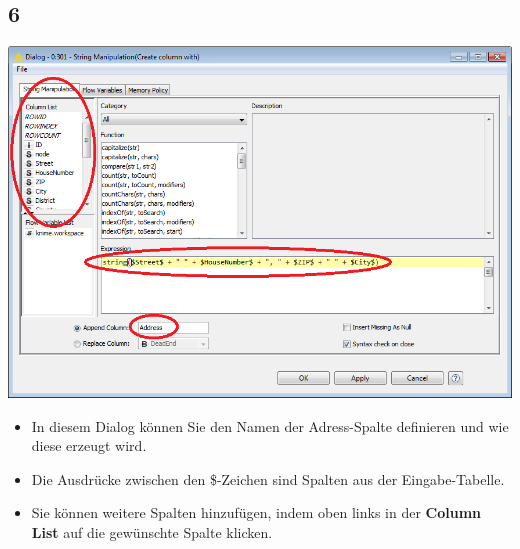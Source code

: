 \documentclass{beamer}
\begin{document}
\subsection{6}
\begin{frame}
	\begin{center}
  		\includegraphics[height=0.6\textheight]{6.png}
	\end{center}
	\begin{itemize}
		\item In diesem Dialog können Sie den Namen der Adress-Spalte definieren und wie diese erzeugt wird.
		\item Die Ausdrücke zwischen den \$-Zeichen sind Spalten aus der Eingabe-Tabelle.
		\item Sie können weitere Spalten hinzufügen, indem oben links in der \textbf{Column List} auf die gewünschte Spalte klicken.
	\end{itemize}
\end{frame}
\end{document}
